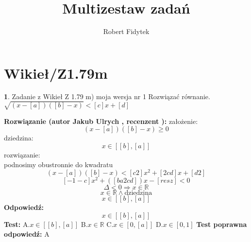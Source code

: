 \documentclass[12pt, a4paper]{article}
\title{Multizestaw zadań}
\author{Robert Fidytek}
\date{}
\theoremstyle{definition} %
\newtheorem{zad}{}
\newcommand{\kategoria}[1]{\section{#1}} %
\newcommand{\zadStart}[1]{\begin{zad}#1\newline} %
\newcommand{\zadStop}{\end{zad}}   %
\newcommand{\rozwStart}[2]{\noindent \textbf{Rozwiązanie (autor #1 , recenzent #2): }\newline} %
\newcommand{\rozwStop}{\newline}                                            %
\newcommand{\odpStart}{\noindent \textbf{Odpowiedź:}\newline}    %
\newcommand{\odpStop}{\newline}                                             %
\newcommand{\testStart}{\noindent \textbf{Test:}\newline} %
\newcommand{\testStop}{\newline} %
\newcommand{\kluczStart}{\noindent \textbf{Test poprawna odpowiedź:}\newline} %
\newcommand{\kluczStop}{\newline} %
\begin{document}
\maketitle


\kategoria{Wikieł/Z1.79m}
\zadStart{Zadanie z Wikieł Z 1.79 m) moja wersja nr 1}
Rozwiązać równanie. $\sqrt{(x-[a])([b]-x)}<[c]x+[d]$
\zadStop
\rozwStart{Jakub Ulrych}{}
założenie: $$(x-[a])([b]-x)\geq0$$
dziedzina:
$$x\in[[b],[a]]$$
rozwiązanie:\\podnosimy obustronnie do kwadratu
$$(x-[a])([b]-x)<[c2]x^{2}+[2cd]x+[d2]$$
$$[-1-c]x^{2}+([ba2cd])x-[resz]<0$$
$$\Delta<0\Rightarrow x\in\mathbb{R}$$
$$x\in\mathbb{R} \land \text{dziedzina}$$
$$x\in[[b],[a]]$$
\rozwStop
\odpStart
$$x\in[[b],[a]]$$
\odpStop
\testStart
A.$x\in[[b],[a]]$
B.$x\in\mathbb{R}$
C.$x\in[0,[a]]$
D.$x\in[0,1]$
\testStop
\kluczStart
A
\kluczStop
\end{document}
